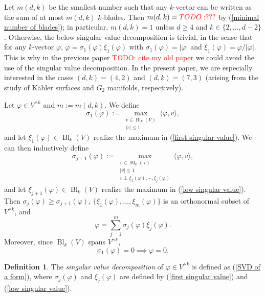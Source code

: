 \documentclass[reqno,11pt]{amsart}
\newcommand{\Bl}{\operatorname{Bl}}
\newcommand{\dfn}[1]{\emph{#1}\index{#1}}
\theoremstyle{definition}
\newtheorem{definition}[theorem]{Definition}
\numberwithin{equation}{section}
\newcommand\todo[1]{\textcolor{red}{TODO: #1}}
\begin{document}
Let $m(d, k)$ be the smallest number such that any $k$-vector can be written as the sum of at most $m(d, k)$ $k$-blades.
Then $m(d, k) = \todo{???}$ by (\ref{minimal number of blades}); in particular, $m(d, k) = 1$ unless $d \geq 4$ and $k \in \{2, \dots, d - 2\}$.
Otherwise, the below singular value decomposition is trivial, in the sense that for any $k$-vector $\varphi$, $\varphi = \sigma_1(\varphi) \xi_1(\varphi)$ with $\sigma_1(\varphi) = |\varphi|$ and $\xi_1(\varphi) = \varphi/|\varphi|$.
This is why in the previous paper \todo{cite my old paper} we could avoid the use of the singular value decomposition.
In the present paper, we are especially interested in the cases $(d, k) = (4, 2)$ and $(d, k) = (7, 3)$ (arising from the study of K\"ahler surfaces and $G_2$ manifolds, respectively).

Let $\varphi \in V^{\wedge k}$ and $m := m(d, k)$.
We define
\begin{equation}\label{first singular value}
\sigma_1(\varphi) := \max_{\substack{v \in \Bl_k(V) \\ |v| \leq 1}} \langle \varphi, v\rangle,
\end{equation}
and let $\xi_1(\varphi) \in \Bl_k(V)$ realize the maximum in (\ref{first singular value}).
We can then inductively define 
\begin{equation}\label{low singular value}
\sigma_{j + 1}(\varphi) := \max_{\substack{v \in \Bl_k(V) \\ |v| \leq 1 \\ v \perp \xi_1(\varphi), \cdots, \xi_j(\varphi)}} \langle \varphi, v\rangle,
\end{equation}
and let $\xi_{j + 1}(\varphi) \in \Bl_k(V)$ realize the maximum in (\ref{low singular value}).
Then $\sigma_j(\varphi) \geq \sigma_{j + 1}(\varphi)$, $\{\xi_1(\varphi), \dots, \xi_m(\varphi)\}$ is an orthonormal subset of $V^{\wedge k}$, and
\begin{equation}\label{SVD of a form}
\varphi = \sum_{j = 1}^m \sigma_j(\varphi) \xi_j(\varphi).
\end{equation}
Moreover, since $\Bl_k(V)$ spans $V^{\wedge k}$,
\begin{equation}\label{seminorms are norms}
\sigma_1(\varphi) = 0 \implies \varphi = 0.
\end{equation}

\begin{definition}
The \dfn{singular value decomposition} of $\varphi \in V^{\wedge k}$ is defined as (\ref{SVD of a form}), where $\sigma_j(\varphi)$ and $\xi_j(\varphi)$ are defined by (\ref{first singular value}) and (\ref{low singular value}).
\end{definition}
\end{document}
